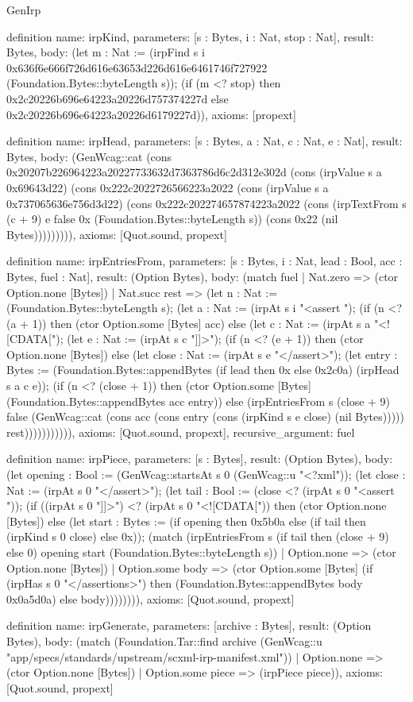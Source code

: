 \begin{lexlean}{GenIrp}
\begin{semanticmodule}
definition{
  name: irpKind,
  parameters: [s : Bytes, i : Nat, stop : Nat],
  result: Bytes,
  body: (let m : Nat := (irpFind s i 0x636f6e666f726d616e63653d226d616e6461746f727922 (Foundation.Bytes::byteLength s)); (if (m <? stop) then 0x2c20226b696e64223a20226d757374227d else 0x2c20226b696e64223a20226d6179227d)),
  axioms: [propext]
}

definition{
  name: irpHead,
  parameters: [s : Bytes, a : Nat, c : Nat, e : Nat],
  result: Bytes,
  body: (GenWcag::cat (cons 0x20207b226964223a20227733632d7363786d6c2d312e302d (cons (irpValue s a 0x69643d22) (cons 0x222c2022726566223a2022 (cons (irpValue s a 0x737065636e756d3d22) (cons 0x222c202274657874223a2022 (cons (irpTextFrom s (c + 9) e false 0x (Foundation.Bytes::byteLength s)) (cons 0x22 (nil Bytes))))))))),
  axioms: [Quot.sound, propext]
}

definition{
  name: irpEntriesFrom,
  parameters: [s : Bytes, i : Nat, lead : Bool, acc : Bytes, fuel : Nat],
  result: (Option Bytes),
  body: (match fuel
    | Nat.zero => (ctor Option.none [Bytes])
    | Nat.succ rest => (let n : Nat := (Foundation.Bytes::byteLength s); (let a : Nat := (irpAt s i "<assert "); (if (n <? (a + 1)) then (ctor Option.some [Bytes] acc) else (let c : Nat := (irpAt s a "<![CDATA["); (let e : Nat := (irpAt s c "]]>"); (if (n <? (e + 1)) then (ctor Option.none [Bytes]) else (let close : Nat := (irpAt s e "</assert>"); (let entry : Bytes := (Foundation.Bytes::appendBytes (if lead then 0x else 0x2c0a) (irpHead s a c e)); (if (n <? (close + 1)) then (ctor Option.some [Bytes] (Foundation.Bytes::appendBytes acc entry)) else (irpEntriesFrom s (close + 9) false (GenWcag::cat (cons acc (cons entry (cons (irpKind s e close) (nil Bytes))))) rest))))))))))),
  axioms: [Quot.sound, propext],
  recursive_argument: fuel
}

definition{
  name: irpPiece,
  parameters: [s : Bytes],
  result: (Option Bytes),
  body: (let opening : Bool := (GenWcag::startsAt s 0 (GenWcag::u "<?xml")); (let close : Nat := (irpAt s 0 "</assert>"); (let tail : Bool := (close <? (irpAt s 0 "<assert ")); (if ((irpAt s 0 "]]>") <? (irpAt s 0 "<![CDATA[")) then (ctor Option.none [Bytes]) else (let start : Bytes := (if opening then 0x5b0a else (if tail then (irpKind s 0 close) else 0x)); (match (irpEntriesFrom s (if tail then (close + 9) else 0) opening start (Foundation.Bytes::byteLength s))
    | Option.none => (ctor Option.none [Bytes])
    | Option.some body => (ctor Option.some [Bytes] (if (irpHas s 0 "</assertions>") then (Foundation.Bytes::appendBytes body 0x0a5d0a) else body)))))))),
  axioms: [Quot.sound, propext]
}

definition{
  name: irpGenerate,
  parameters: [archive : Bytes],
  result: (Option Bytes),
  body: (match (Foundation.Tar::find archive (GenWcag::u "app/specs/standards/upstream/scxml-irp-manifest.xml"))
    | Option.none => (ctor Option.none [Bytes])
    | Option.some piece => (irpPiece piece)),
  axioms: [Quot.sound, propext]
}
\end{semanticmodule}
\end{lexlean}
